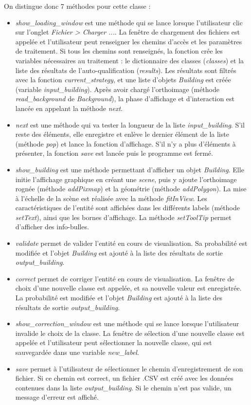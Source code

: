 \noindent On distingue donc 7 méthodes pour cette classe :
\begin{itemize}[label=$\rightarrow$]
	\item \textit{show\_loading\_window} est une méthode qui se lance lorsque l'utilisateur clic sur l'onglet \textit{Fichier > Charger ...}. La fenêtre de chargement des fichiers est appelée et l'utilisateur peut renseigner les chemins d'accès et les paramètres de traitement. Si tous les chemins sont renseignés, la fonction crée les variables nécessaires au traitement : le dictionnaire des classes (\textit{classes}) et la liste des résultats de l'auto-qualification (\textit{results}). Les résultats sont filtrés avec la fonction \textit{current\_strategy}, et une liste d'objets \textit{Building} est créée (variable \textit{input\_building}). Après avoir chargé l'orthoimage (méthode \textit{read\_background} de \textit{Background}), la phase d'affichage et d'interaction est lancée en appelant la méthode \textit{next}.
	\item \textit{next} est une méthode qui va tester la longueur de la liste \textit{input\_building}. S'il reste des éléments, elle enregistre et enlève le dernier élément de la liste (méthode \textit{pop}) et lance la fonction d'affichage. S'il n'y a plus d'éléments à présenter, la fonction \textit{save} est lancée puis le programme est fermé.
	\item \textit{show\_building} est une méthode permettant d'afficher un objet \textit{Building}. Elle initie l'affichage graphique en créant une \textit{scene}, puis y ajoute l'orthoimage rognée (méthode \textit{addPixmap}) et la géométrie (méthode \textit{addPolygon}). La mise à l'échelle de la scène est réalisée avec la méthode \textit{fitInView}. Les caractéristiques de l'entité sont affichées dans les différents labels (méthode \textit{setText}), ainsi que les bornes d'affichage. La méthode \textit{setToolTip} permet d'afficher des info-bulles.
	\item \textit{validate} permet de valider l'entité en cours de visualisation. Sa probabilité est modifiée et l'objet \textit{Building} est ajouté à la liste des résultats de sortie \textit{output\_building}. 
	\item \textit{correct} permet de corriger l'entité en cours de visualisation. La fenêtre de choix d'une nouvelle classe est appelée, et sa nouvelle valeur est enregistrée. La probabilité est modifiée et l'objet \textit{Building} est ajouté à la liste des résultats de sortie \textit{output\_building}.
	\item \textit{show\_correction\_window} est une méthode qui se lance lorsque l'utilisateur invalide le choix de la classe. La fenêtre de sélection d'une nouvelle classe est appelée et l'utilisateur peut sélectionner la nouvelle classe, qui est sauvegardée dans une variable \textit{new\_label}.
	\item \textit{save} permet à l'utilisateur de sélectionner le chemin d'enregistrement de son fichier. Si ce chemin est correct, un fichier .CSV est créé avec les données contenues dans la liste \textit{output\_building}. Si le chemin n'est pas valide, un message d'erreur est affiché.\\
\end{itemize}

